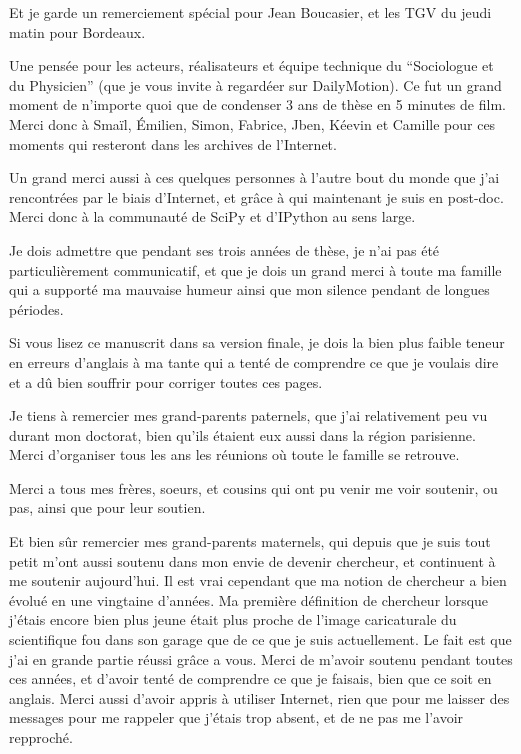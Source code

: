 \documentclass[A4paperpaper,11pt,english]{sphinxmanual}
\begin{document}
Et je garde un remerciement spécial pour Jean Boucasier, et les TGV du jeudi
matin pour Bordeaux.

Une pensée pour les acteurs, réalisateurs et équipe technique du ``Sociologue et
du Physicien'' (que je vous invite à regardéer sur DailyMotion). Ce fut un grand
moment de n'importe quoi que de condenser 3 ans de thèse en 5 minutes de film.
Merci donc à Smaïl, Émilien, Simon, Fabrice, Jben, Kéevin et Camille pour ces
moments qui resteront dans les archives de l'Internet.

Un grand merci aussi à ces quelques personnes à l'autre bout du monde que j'ai
rencontrées par le biais d'Internet, et grâce à qui maintenant je suis en post-doc.
Merci donc à la communauté de SciPy et d'IPython au sens large.

Je dois admettre que pendant ses trois années de thèse, je n'ai pas été
particulièrement communicatif, et que je dois un grand merci à toute ma famille
qui a supporté ma mauvaise humeur ainsi que mon silence pendant de longues
périodes.

Si vous lisez ce manuscrit dans sa version finale, je dois la bien plus faible
teneur en erreurs d'anglais à ma tante qui a tenté de comprendre ce que je
voulais dire et a dû bien souffrir pour corriger toutes ces pages.

Je tiens à remercier mes grand-parents paternels, que j'ai relativement peu vu
durant mon doctorat, bien qu'ils étaient eux aussi dans la région parisienne.
Merci d'organiser tous les ans les réunions où toute le famille se retrouve.

Merci a tous mes frères, soeurs, et cousins qui ont pu venir me voir soutenir,
ou pas, ainsi que pour leur soutien.

Et bien sûr remercier mes grand-parents maternels, qui depuis que je suis tout
petit m'ont aussi soutenu dans mon envie de devenir chercheur, et continuent à me
soutenir aujourd'hui. Il est vrai cependant que ma notion de chercheur a bien
évolué en une vingtaine d'années. Ma première définition de chercheur lorsque
j'étais encore bien plus jeune était plus proche de l'image caricaturale du
scientifique fou dans son garage que de ce que je suis actuellement. Le fait
est que j'ai en grande partie réussi grâce a vous. Merci de m'avoir soutenu
pendant toutes ces années, et d'avoir tenté de comprendre ce que je faisais,
bien que ce soit en anglais. Merci aussi d'avoir appris à utiliser Internet,
rien que pour me laisser des messages pour me rappeler que j'étais trop absent,
et de ne pas me l'avoir repproché.
\end{document}
